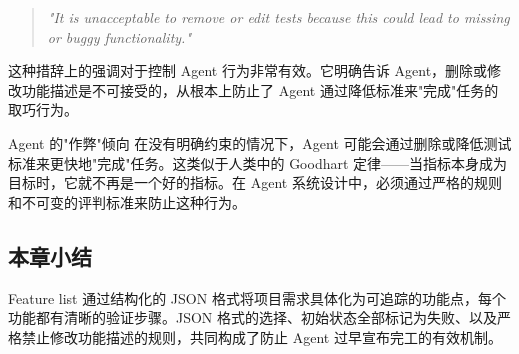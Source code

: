 \begin{quote}
\textit{"It is unacceptable to remove or edit tests because this could lead to missing or buggy functionality."}
\end{quote}

这种措辞上的强调对于控制 Agent 行为非常有效。它明确告诉 Agent，删除或修改功能描述是不可接受的，从根本上防止了 Agent 通过降低标准来"完成"任务的取巧行为。

\begin{warningbox}{Agent 的"作弊"倾向}
在没有明确约束的情况下，Agent 可能会通过删除或降低测试标准来更快地"完成"任务。这类似于人类中的 Goodhart 定律——当指标本身成为目标时，它就不再是一个好的指标。在 Agent 系统设计中，必须通过严格的规则和不可变的评判标准来防止这种行为。
\end{warningbox}

\subsection{本章小结}

Feature list 通过结构化的 JSON 格式将项目需求具体化为可追踪的功能点，每个功能都有清晰的验证步骤。JSON 格式的选择、初始状态全部标记为失败、以及严格禁止修改功能描述的规则，共同构成了防止 Agent 过早宣布完工的有效机制。


